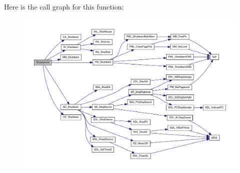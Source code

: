 Here is the call graph for this function:
\nopagebreak
\begin{figure}[H]
\begin{center}
\leavevmode
\includegraphics[width=400pt]{WL__DEF_8H_a715f77542ce1f3db369235ae2d841d2e_cgraph}
\end{center}
\end{figure}




